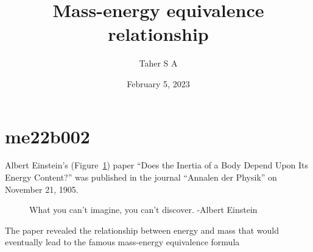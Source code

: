 \documentclass[12pt,a4paper]{article}
\author{Taher S A}
\title{Mass-energy equivalence relationship}
\date{February 5, 2023}
\begin{document}
\maketitle

\section{me22b002}

Albert Einstein’s (Figure~\ref{pic}) paper “Does the Inertia of a Body Depend Upon Its Energy Content?” was published in the journal “Annalen der Physik” on November 21, 1905.

\begin{figure}[h]
	\begin{center}
	\end{center}
	\caption{What you can't imagine, you can't discover. -Albert Einstein}
	\label{pic}
\end{figure}

The paper revealed the relationship between energy and mass that would eventually lead to the famous mass-energy equivalence formula 
\end{document}
